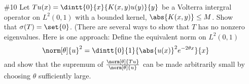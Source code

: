 \documentclass[11pt, oneside]{article}
\begin{document}
\begin{enumerate}
\begin{enumerate}
      \item[(iii)]
        Show that $\sigma(T_3) = \sigma_r(T_3) = \CC$.

        \begin{proof}
          Let $\lambda \in \CC$,
          Again as in part (i) if $T_3 u = \lambda u$ is going to have a
          solution, then it must be in the form $u(x) = A e^{\lambda x}$.
          However if $u \in D(T_3)$, then $u(0) = u(1) = 0$ and this implies
          that $A = 0$ which makes $u(x) = 0$.
          Thus there is no nonzero solution to $T_3 u = \lambda u$.
          Thus for any $\lambda \in \CC$, the operator $T_3 - \lambda I$ is
          one-to-one.

          As is part (ii) we can say that the equation
          $T_3 u - \lambda u = f$ has a solution if and only if
          $\d*{e^{-\lambda x} u} = e^{-\lambda x} f$.
          Let $G(x)$ be any antiderivative of $e^{-\lambda x} f$, then
          $u = e^{\lambda x} G(x)$.
          So in order for $u$ to be in $D(T_3)$ this implies that
          $G(0) = G(1) = 0$.
          This can only happen if
          \[
            \dintt{0}{1}{f(x) e^{-\lambda x}}{x} = 0
          \]
          So there is a solution to $(\lambda I - T_3)u = f$ when
          $f$ has this property.
          The set of $f \in L^2(0, 1)$, which have this property are not a
          dense subset of $L^2(0, 1)$, so this implies that
          $\lambda \in \sigma_r(T_3)$.
          Since this was true for any $\lambda$, this means that
          \[
            \sigma_r(T_3) = \CC
          \]
        \end{proof}
    \end{enumerate}

  \pagebreak
  \item[\#10] %
    Let $Tu(x) = \dintt{0}{x}{K(x, y)u(y)}{y}$ be a Volterra intergral operator
    on $L^2(0, 1)$ with a bounded kernel, $\abs{K(x, y)} \le M$.
    Show that $\sigma(T) = \set{0}$.
    (There are several ways to show that $T$ has no nonzero eigenvalues.
    Here is one approach: Define the equivalent norm on $L^2(0, 1)$
    \[
      \norm[\theta]{u}^2 = \dintt{0}{1}{\abs{u(x)}^2e^{-2\theta x}}{x}
    \]
    and show that the supremum of $\frac{\norm[\theta]{Tu}}{\norm[\theta]{u}}$
    can be made arbitrarily small by choosing $\theta$ sufficiently large.


\end{enumerate}
\end{document}
